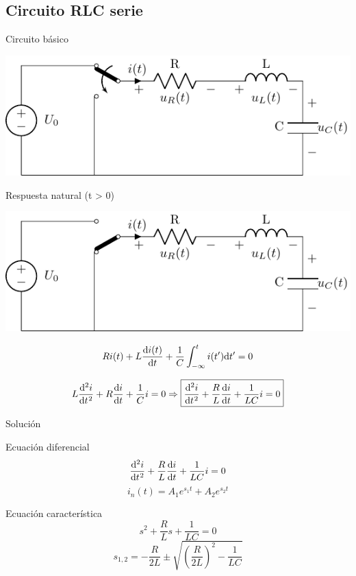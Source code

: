 \documentclass[aspectratio=169, usenames,svgnames,dvipsnames]{beamer}
\begin{document}
\subsection{Circuito RLC serie}
\label{sec:org1c61c74}
\begin{frame}[label={sec:org37ed748}]{Circuito básico}
\begin{center}
\includegraphics[width=.9\linewidth]{../figs/transitorio_circuitoRLC_serie.pdf}
\end{center}
\end{frame}
\begin{frame}[label={sec:orgbf980bf}]{Respuesta natural (t > 0)}
\begin{center}
\includegraphics[height=0.45\textheight]{../figs/transitorio_circuitoRLC_serie_t0+.pdf}
\end{center}

\[
  Ri(t) + L\diff{i(t)}{t} + \frac{1}{C}\int_{-\infty}^t i(t') \mathrm{d}t' = 0
\]

\[
  L\diff[2]{i}{t} + R\diff{i}{t} + \frac{1}{C} i = 0 \Rightarrow
  \boxed{\diff[2]{i}{t} + \frac{R}{L} \diff{i}{t} + \frac{1}{LC} i = 0}
\]
\end{frame}
\begin{frame}[label={sec:org0b53ad9}]{Solución}
\begin{block}{Ecuación diferencial}
\[
\diff[2]{i}{t} + \frac{R}{L} \diff{i}{t} + \frac{1}{LC} i = 0
\]
\[
    i_n(t) = A_1 e^{s_1 t} + A_2 e^{s_2 t}
\]
\end{block}
\begin{block}{Ecuación característica}
\[
s^2 + \frac{R}{L} s + \frac{1}{LC} = 0  
\]
\[
  s_{1,2} = -\frac{R}{2L} \pm \sqrt{\left(\frac{R}{2L}\right)^2 - \frac{1}{LC}}
\]
\end{block}
\end{frame}
\end{document}
